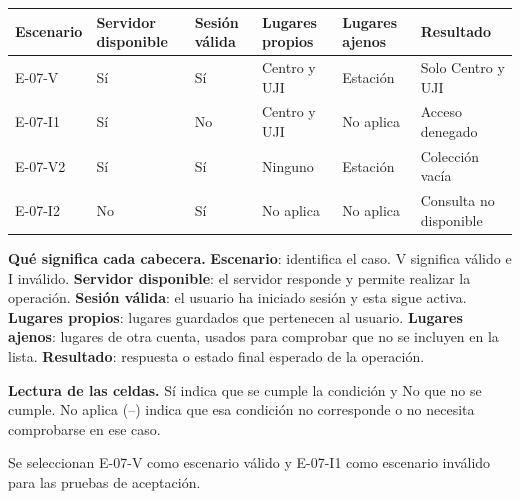 \begingroup\fontsize{7.8}{11}\selectfont\setlength{\tabcolsep}{3pt}
\begin{tabularx}{\linewidth}{@{}*{6}{Y}@{}}\toprule
\textbf{Escenario} & \textbf{Servidor disponible} & \textbf{Sesión válida} & \textbf{Lugares propios} & \textbf{Lugares ajenos} & \textbf{Resultado}\\\midrule
E-07-V & Sí & Sí & Centro y UJI & Estación & Solo Centro y UJI\\[3pt]
E-07-I1 & Sí & No & Centro y UJI & No aplica & Acceso denegado\\[3pt]
E-07-V2 & Sí & Sí & Ninguno & Estación & Colección vacía\\[3pt]
E-07-I2 & No & Sí & No aplica & No aplica & Consulta no disponible\\[3pt]
\bottomrule\end{tabularx}\endgroup\par
{\fontsize{9}{11}\selectfont\textbf{Qué significa cada cabecera.} \textbf{Escenario}: identifica el caso. V significa válido e I inválido. \textbf{Servidor disponible}: el servidor responde y permite realizar la operación. \textbf{Sesión válida}: el usuario ha iniciado sesión y esta sigue activa. \textbf{Lugares propios}: lugares guardados que pertenecen al usuario. \textbf{Lugares ajenos}: lugares de otra cuenta, usados para comprobar que no se incluyen en la lista. \textbf{Resultado}: respuesta o estado final esperado de la operación.\par\textbf{Lectura de las celdas.} Sí indica que se cumple la condición y No que no se cumple. No aplica (--) indica que esa condición no corresponde o no necesita comprobarse en ese caso.\par}


Se seleccionan E-07-V como escenario válido y E-07-I1 como escenario inválido para las pruebas de aceptación.\par


